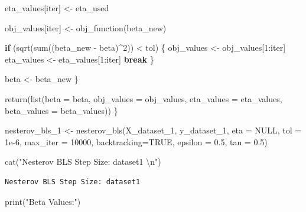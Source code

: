\documentclass[
  letterpaper,
  DIV=11,
  numbers=noendperiod]{scrartcl}
\newenvironment{Shaded}{\begin{snugshade}}{\end{snugshade}}
\newcommand{\AttributeTok}[1]{\textcolor[rgb]{0.40,0.45,0.13}{#1}}
\newcommand{\ConstantTok}[1]{\textcolor[rgb]{0.56,0.35,0.01}{#1}}
\newcommand{\ControlFlowTok}[1]{\textcolor[rgb]{0.00,0.23,0.31}{\textbf{#1}}}
\newcommand{\DecValTok}[1]{\textcolor[rgb]{0.68,0.00,0.00}{#1}}
\newcommand{\FloatTok}[1]{\textcolor[rgb]{0.68,0.00,0.00}{#1}}
\newcommand{\FunctionTok}[1]{\textcolor[rgb]{0.28,0.35,0.67}{#1}}
\newcommand{\NormalTok}[1]{\textcolor[rgb]{0.00,0.23,0.31}{#1}}
\newcommand{\OtherTok}[1]{\textcolor[rgb]{0.00,0.23,0.31}{#1}}
\newcommand{\SpecialCharTok}[1]{\textcolor[rgb]{0.37,0.37,0.37}{#1}}
\newcommand{\StringTok}[1]{\textcolor[rgb]{0.13,0.47,0.30}{#1}}
\begin{document}
\begin{Shaded}
\begin{Highlighting}[]
\NormalTok{    eta\_values[iter] }\OtherTok{\textless{}{-}}\NormalTok{ eta\_used}
    
\NormalTok{    obj\_values[iter] }\OtherTok{\textless{}{-}} \FunctionTok{obj\_function}\NormalTok{(beta\_new)}
    
    \ControlFlowTok{if}\NormalTok{ (}\FunctionTok{sqrt}\NormalTok{(}\FunctionTok{sum}\NormalTok{((beta\_new }\SpecialCharTok{{-}}\NormalTok{ beta)}\SpecialCharTok{\^{}}\DecValTok{2}\NormalTok{)) }\SpecialCharTok{\textless{}}\NormalTok{ tol) \{}
\NormalTok{      obj\_values }\OtherTok{\textless{}{-}}\NormalTok{ obj\_values[}\DecValTok{1}\SpecialCharTok{:}\NormalTok{iter]}
\NormalTok{      eta\_values }\OtherTok{\textless{}{-}}\NormalTok{ eta\_values[}\DecValTok{1}\SpecialCharTok{:}\NormalTok{iter]}
      \ControlFlowTok{break}
\NormalTok{    \}}
    
\NormalTok{    beta }\OtherTok{\textless{}{-}}\NormalTok{ beta\_new}
\NormalTok{  \}}
  
  \FunctionTok{return}\NormalTok{(}\FunctionTok{list}\NormalTok{(}\AttributeTok{beta =}\NormalTok{ beta, }\AttributeTok{obj\_values =}\NormalTok{ obj\_values, }\AttributeTok{eta\_values =}\NormalTok{ eta\_values, }\AttributeTok{beta\_values =}\NormalTok{ beta\_values))}
\NormalTok{\}}

\NormalTok{nesterov\_bls\_1 }\OtherTok{\textless{}{-}} \FunctionTok{nesterov\_bls}\NormalTok{(X\_dataset\_1, y\_dataset\_1, }\AttributeTok{eta =} \ConstantTok{NULL}\NormalTok{, }\AttributeTok{tol =} \FloatTok{1e{-}6}\NormalTok{, }\AttributeTok{max\_iter =} \DecValTok{10000}\NormalTok{, }\AttributeTok{backtracking=}\ConstantTok{TRUE}\NormalTok{, }\AttributeTok{epsilon =} \FloatTok{0.5}\NormalTok{, }\AttributeTok{tau =} \FloatTok{0.5}\NormalTok{)}

\FunctionTok{cat}\NormalTok{(}\StringTok{"Nesterov BLS Step Size: dataset1 }\SpecialCharTok{\textbackslash{}n}\StringTok{"}\NormalTok{)}
\end{Highlighting}
\end{Shaded}

\begin{verbatim}
Nesterov BLS Step Size: dataset1 
\end{verbatim}

\begin{Shaded}
\begin{Highlighting}[]
\FunctionTok{print}\NormalTok{(}\StringTok{"Beta Values:"}\NormalTok{)}
\end{Highlighting}
\end{Shaded}
\end{document}
